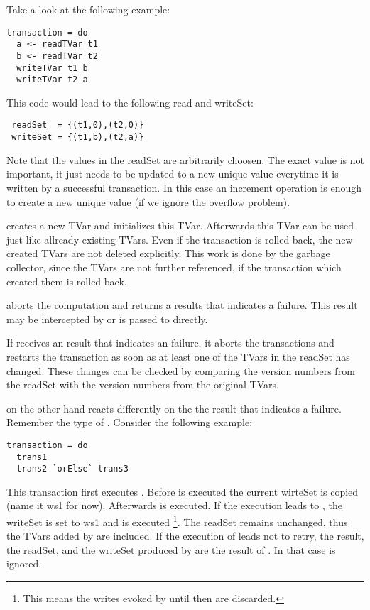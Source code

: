 Take a look at the following example:
\begin{lstlisting}
transaction = do
  a <- readTVar t1
  b <- readTVar t2
  writeTVar t1 b
  writeTVar t2 a
\end{lstlisting}
This code would lead to the following read and writeSet:
\begin{lstlisting}
 readSet  = {(t1,0),(t2,0)}
 writeSet = {(t1,b),(t2,a)}
\end{lstlisting}
Note that the values in the readSet are arbitrarily choosen. The exact value is not important, it just needs to be updated 
to a new unique value everytime it is written by a successful transaction. In this case an increment operation 
is enough to create a new unique value (if we ignore the overflow problem). 

 creates a new TVar and initializes this TVar. Afterwards this TVar can be used just like allready existing TVars.
Even if the transaction is rolled back, the new created TVars are not deleted explicitly. This work is done by the garbage
collector, since the TVars are not further referenced, if the transaction which created them is rolled back. 

 aborts the computation and returns a results that indicates a failure. This result may be intercepted by 
 or is passed to  directly. 

If  receives an result that indicates an failure, it aborts the transactions and restarts the transaction as soon as
at least one of the TVars in the readSet has changed. These changes can be checked by comparing the version numbers from the readSet 
with the version numbers from the original TVars.   

 on the other hand reacts differently on the the result that indicates a failure. Remember the type of 
. Consider the following example:
\begin{lstlisting}
transaction = do 
  trans1
  trans2 `orElse` trans3
\end{lstlisting}
This transaction first executes . Before  is executed the current wirteSet is copied (name it ws1 for now). Afterwards 
 is executed. If the execution leads to , the writeSet is set to ws1 and  is executed
\footnote{This means the writes evoked by  until then are discarded.}. The readSet remains unchanged, thus the TVars added
by  are included. If the execution of  leads not to retry, the result, the readSet, and the writeSet produced by 
 are the result of . In that case  is ignored. 

